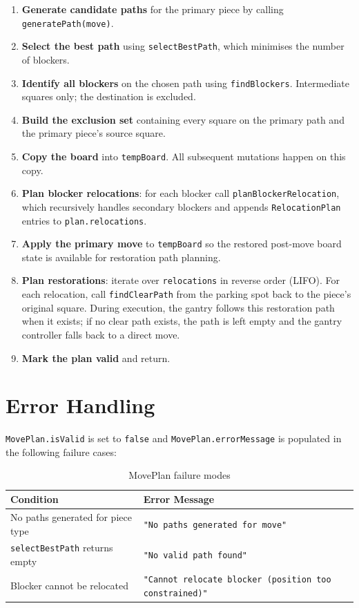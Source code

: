 \documentclass[11pt,a4paper]{report}
\begin{document}
\begin{enumerate}
    \item \textbf{Generate candidate paths} for the primary piece by calling \texttt{generatePath(move)}.
    \item \textbf{Select the best path} using \texttt{selectBestPath}, which minimises the number of blockers.
    \item \textbf{Identify all blockers} on the chosen path using \texttt{findBlockers}. Intermediate squares only; the destination is excluded.
    \item \textbf{Build the exclusion set} containing every square on the primary path and the primary piece's source square.
    \item \textbf{Copy the board} into \texttt{tempBoard}. All subsequent mutations happen on this copy.
    \item \textbf{Plan blocker relocations}: for each blocker call \texttt{planBlockerRelocation}, which recursively handles secondary blockers and appends \texttt{RelocationPlan} entries to \texttt{plan.relocations}.
    \item \textbf{Apply the primary move} to \texttt{tempBoard} so the restored post-move board state is available for restoration path planning.
    \item \textbf{Plan restorations}: iterate over \texttt{relocations} in reverse order (LIFO). For each relocation, call \texttt{findClearPath} from the parking spot back to the piece's original square. During execution, the gantry follows this restoration path when it exists; if no clear path exists, the path is left empty and the gantry controller falls back to a direct move.
    \item \textbf{Mark the plan valid} and return.
\end{enumerate}

\section{Error Handling}

\texttt{MovePlan.isValid} is set to \texttt{false} and \texttt{MovePlan.errorMessage} is populated in the following failure cases:

\begin{table}[h]
\centering
\begin{tabular}{ll}
\toprule
\textbf{Condition} & \textbf{Error Message} \\
\midrule
No paths generated for piece type & \texttt{"No paths generated for move"} \\
\texttt{selectBestPath} returns empty & \texttt{"No valid path found"} \\
Blocker cannot be relocated & \texttt{"Cannot relocate blocker (position too constrained)"} \\
\bottomrule
\end{tabular}
\caption{MovePlan failure modes}
\end{table}
\end{document}
